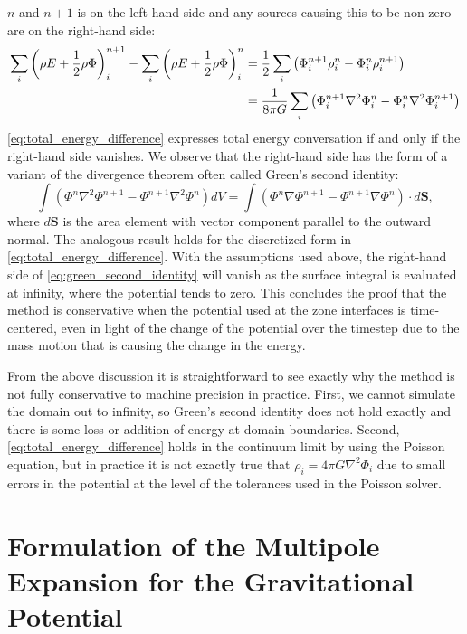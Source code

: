 \documentclass[12pt]{article}
\begin{document}
$n$ and $n+1$ is on the left-hand side and any sources causing this to be non-zero are on the right-hand side:
\begin{align}
  \sum_{i} \left(\rho E + \frac{1}{2}\rho\Phi\right)_i^{n+1} - \sum_{i} \left(\rho E + \frac{1}{2}\rho\Phi\right)_i^{n} &= \frac{1}{2}\sum_{i} \left(\Phi_i^{n+1}\rho_i^{n} - \Phi_i^{n}\rho_i^{n+1}\right) \notag \\
       &= \frac{1}{8\pi G} \sum_{i}\left(\Phi_{i}^{n+1}\nabla^2 \Phi_{i}^{n} - \Phi_i^{n}\nabla^2 \Phi_{i}^{n+1}\right) \label{eq:total_energy_difference}
\end{align}
\autoref{eq:total_energy_difference} expresses total energy conversation if and only if the right-hand side vanishes.
We observe that the right-hand side has the form of a variant of the divergence theorem often called Green's second identity:
\begin{equation}
  \int (\Phi^{n}\nabla^2 \Phi^{n+1} - \Phi^{n+1}\nabla^2 \Phi^{n}) dV = \int \left(\Phi^{n} \nabla \Phi^{n+1} - \Phi^{n+1} \nabla \Phi^{n}\right) \cdot d\mathbf{S}, \label{eq:green_second_identity}
\end{equation}
where $d\mathbf{S}$ is the area element with vector component parallel to the outward normal. The analogous result holds for the
discretized form in \autoref{eq:total_energy_difference}. With the assumptions used above, the right-hand side of
\autoref{eq:green_second_identity} will vanish as the surface integral is evaluated at infinity, where the potential
tends to zero. This concludes the proof that the method is conservative when the potential used at the zone interfaces
is time-centered, even in light of the change of the potential over the timestep due to the mass motion that is causing the change in the energy.

From the above discussion it is straightforward to see exactly why the method is not fully conservative to machine
precision in practice. First, we cannot simulate the domain out to infinity, so Green's second identity does not hold exactly
and there is some loss or addition of energy at domain boundaries. Second, \autoref{eq:total_energy_difference} holds in the
continuum limit by using the Poisson equation, but in practice it is not exactly true that $\rho_i = 4\pi G \nabla^2 \Phi_{i}$ due
to small errors in the potential at the level of the tolerances used in the Poisson solver.



\newpage
\section{Formulation of the Multipole Expansion for the Gravitational Potential}
\label{app:multipole}
\end{document}
